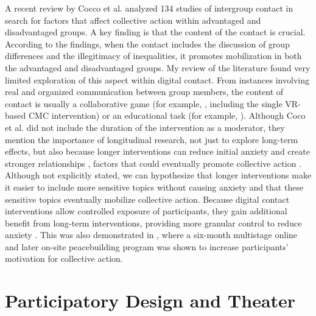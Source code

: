 \documentclass[dissertation,math,vertlayout,pdfa,colorlinks]{aaltoseries}
\begin{document}
A recent review by Cocco et al. \cite{coccoMobilizingSedativeEffects2024} analyzed 134 studies of intergroup contact in search for factors that affect collective action within advantaged and disadvantaged groups. A key finding is that the content of the contact is crucial. According to the findings, when the contact includes the discussion of group differences and the illegitimacy of inequalities, it promotes mobilization in both the advantaged and disadvantaged groups. My review of the literature found very limited exploration of this aspect within digital contact. From instances involving real and organized communication between group members, the content of contact is usually a collaborative game (for example, \cite{stiffPlayingWellOthers2020, tassinariInvestigatingInfluenceIntergroup2022, benatovGamingPeaceVirtual2021}, including the single VR-based CMC intervention) or an educational task (for example, \cite{waltherComputermediatedCommunicationReduction2015,enicOnlineContactsSupported2024, whiteDualIdentityelectronicContact2012}). Although Coco et al. did not include the duration of the intervention as a moderator, they mention the importance of longitudinal research, not just to explore long-term effects, but also because longer interventions can reduce initial anxiety and create stronger relationships \cite{troppAdaptationDiversityIndividual2019, macinnisHowCanIntergroup2015,pettigrewAdvancingIntergroupContact2021}, factors that could eventually promote collective action \cite{coccoMobilizingSedativeEffects2024}. Although not explicitly stated, we can hypothesize that longer interventions make it easier to include more sensitive topics without causing anxiety and that these sensitive topics eventually mobilize collective action. Because digital contact interventions allow controlled exposure of participants, they gain additional benefit from long-term interventions, providing more granular control to reduce anxiety \cite{amichai-hamburgerStructuredUnstructuredIntergroup2015}. This was also demonstrated in \cite{segalGoingHybridUsing2022}, where a six-month multistage online and later on-site peacebuilding program was shown to increase participants' motivation for collective action.

\section{Participatory Design and Theater}
\end{document}
